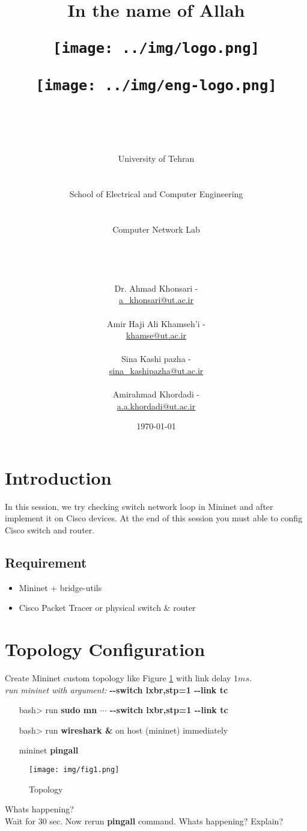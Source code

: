 \documentclass[10pt,a4paper]{article}
\title{
\normalsize In the name of Allah\\
\vspace{10pt}
\LARGE\FR{بسم \allah الرحمن الرحیم}
\vspace{10pt}
\begin{center}
	\begin{minipage}{0.48\textwidth} \begin{flushleft}
			\texttt{[image: ../img/logo.png]}
	\end{flushleft}\end{minipage}
	\begin{minipage}{0.48\textwidth} \begin{flushright}
			\texttt{[image: ../img/eng-logo.png]}
	\end{flushright}\end{minipage}
\end{center}
\vspace*{-64pt}
	\huge \titleText\\
\vspace{40pt}
}
\author{
	\huge University of Tehran\\
	\LARGE \FR{دانشگاه تهران}\\
	\\
	\LARGE School of Electrical and Computer Engineering\\
	\FR{دانشکده مهندسی برق و کامپیوتر}\\
	\\
	\Large Computer Network Lab\\
	\FR{آزمایشگاه شبکه‌های کامپیوتری}\\
	\\
	\\
	\\
	\normalfont
	Dr. Ahmad Khonsari - \FR{احمد خونساری}\\
	\href{mailto:a_khonsari@ut.ac.ir}{a\_khonsari@ut.ac.ir}\\
	\\
	\normalsize
	Amir Haji Ali Khamseh'i - \FR{امیر حاجی علی خمسه‌ء}\\
	\href{mailto:khamse@ut.ac.ir}{khamse@ut.ac.ir}\\
	\\
	\normalsize
	Sina Kashi pazha - \FR{سینا کاشی پزها}\\
	\href{mailto:sina\_kashipazha@ut.ac.ir}{sina\_kashipazha@ut.ac.ir}\\
	\\
	\normalsize
	Amirahmad Khordadi - \FR{امیر احمد خردادی}\\
	\href{mailto:a.a.khordadi@ut.ac.ir}{a.a.khordadi@ut.ac.ir}
}
\date{\vspace{30pt}\today\\\vspace{10pt}{\selectlanguage{farsi}\today}}
\numberwithin{equation}{section}
\numberwithin{figure}{section}
\numberwithin{table}{section}
\begin{document}

\maketitle


\pagebreak


\section{Introduction}
In this session, we try checking switch network loop in Mininet and after implement it on Cisco devices. At the end of this session you must able to config Cisco switch and router.

\subsection*{Requirement}
\begin{itemize}
    \item Mininet + bridge-utils
    \item Cisco Packet Tracer or physical switch \& router
\end{itemize}

\section{Topology Configuration}
    Create Mininet custom topology like Figure \ref{fig:topology} with link delay $ 1 ms $.\\
    \textit{run mininet with argument: }\textbf{-{}-switch lxbr,stp=1 -{}-link tc}

    \begin{itemize}
        \setlength{\itemindent}{30pt}
        \item [bash>] run \textbf{sudo mn $\cdots$ -{}-switch lxbr,stp=1 -{}-link tc}
        \item [bash>] run \textbf{wireshark \&} on host (mininet) immediately
        \item [mininet] \textbf{pingall}
    \end{itemize}
    
\begin{figure}[H]
    \centering
    \texttt{[image: img/fig1.png]}
    \caption{Topology}
    \label{fig:topology}
\end{figure}

    Whats happening?\\
    Wait for 30 sec. Now rerun \textbf{pingall} command.
    Whats happening? Explain?
\end{document}
